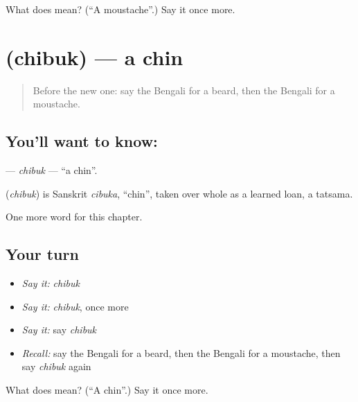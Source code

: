 \begin{tcolorbox}[breakable,colback=teal!4,colframe=teal!35!black,title={Before you move on}]
What does  mean? (\textquotedblleft{}A moustache\textquotedblright{}.) Say it once more.
\end{tcolorbox}
\section[\texorpdfstring{\bn{চিবুক} (chibuk)}{চিবুক (chibuk)}]{ (chibuk) — a chin}

\label{lesson:BN-C243-chibuk}



\begin{quote}
Before the new one: say the Bengali for a beard, then the Bengali for a moustache.
\end{quote}

\subsection*{You'll want to know: }
\textbf{} — \emph{chibuk} — \textquotedblleft{}a chin\textquotedblright{}.

\begin{cousinweb}
\textbf{} (\emph{chibuk}) is Sanskrit \emph{cibuka}, \textquotedblleft{}chin\textquotedblright{}, taken over whole as a learned loan, a tatsama.
\end{cousinweb}

\begin{grammarlens}[title={What you've built}]
One more word for this chapter.
\end{grammarlens}

\subsection*{Your turn}
\begin{itemize}
\raggedright
  \item \emph{Say it:} \emph{chibuk}
  \item \emph{Say it:} \emph{chibuk}, once more
  \item \emph{Say it:} say \emph{chibuk}
  \item \emph{Recall:} say the Bengali for a beard, then the Bengali for a moustache, then say \emph{chibuk} again
\end{itemize}

\begin{tcolorbox}[breakable,colback=teal!4,colframe=teal!35!black,title={Before you move on}]
What does  mean? (\textquotedblleft{}A chin\textquotedblright{}.) Say it once more.
\end{tcolorbox}
